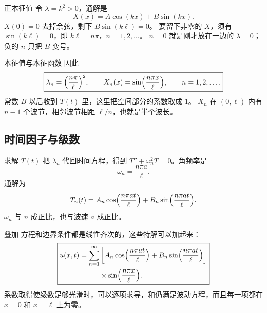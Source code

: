 \documentclass[fontset=windows, chinese, 10pt, xcolor=dvipsnames]{beamer}
\begin{document}
\begin{frame}{正本征值}
  令 $\lambda=k^2>0$，通解是
  \begin{equation*}
    X(x)=A\cos(kx)+B\sin(kx).
  \end{equation*}
  $X(0)=0$ 去掉余弦，剩下 $B\sin(k\ell)=0$。
  要留下非零的 $X$，须有 $\sin(k\ell)=0$，即 $k\ell=n\pi$，$n=1,2,\ldots$。
  $n=0$ 就是刚才放在一边的 $\lambda=0$；负的 $n$ 只把 $B$ 变号。
\end{frame}

\begin{frame}{本征值与本征函数}
  因此
  \begin{equation*}
    \boxed{\lambda_n=\Bigl(\frac{n\pi}{\ell}\Bigr)^2,
    \qquad
    X_n(x)=\sin\Bigl(\frac{n\pi x}{\ell}\Bigr),
    \qquad n=1,2,\ldots.}
  \end{equation*}
  常数 $B$ 以后收到 $T(t)$ 里，这里把空间部分的系数取成 $1$。
  \vspace{0.3em}
  $X_n$ 在 $(0,\ell)$ 内有 $n-1$ 个波节，相邻波节相距 $\ell/n$，也就是半个波长。
\end{frame}

\subsection{时间因子与级数}

\begin{frame}{求解 $T(t)$}
  把 $\lambda_n$ 代回时间方程，得到 $T''+\omega_n^2 T=0$。角频率是
  \begin{equation*}
    \omega_n=\frac{n\pi a}{\ell}.
  \end{equation*}
  通解为
  \begin{equation*}
    T_n(t)=A_n\cos\Bigl(\frac{n\pi a t}{\ell}\Bigr)
           +B_n\sin\Bigl(\frac{n\pi a t}{\ell}\Bigr).
  \end{equation*}
  $\omega_n$ 与 $n$ 成正比，也与波速 $a$ 成正比。
\end{frame}

\begin{frame}{叠加}
  方程和边界条件都是线性齐次的，这些特解可以加起来：
  \begin{equation*}
    \boxed{
    \begin{aligned}
    u(x,t)=\sum_{n=1}^{\infty}
    &\left[A_n\cos\Bigl(\frac{n\pi a t}{\ell}\Bigr)
      +B_n\sin\Bigl(\frac{n\pi a t}{\ell}\Bigr)\right]\\
    &\times\sin\Bigl(\frac{n\pi x}{\ell}\Bigr).
    \end{aligned}}
  \end{equation*}
  系数取得使级数足够光滑时，可以逐项求导，和仍满足波动方程，而且每一项都在 $x=0$ 和 $x=\ell$ 上为零。
\end{frame}
\end{document}

